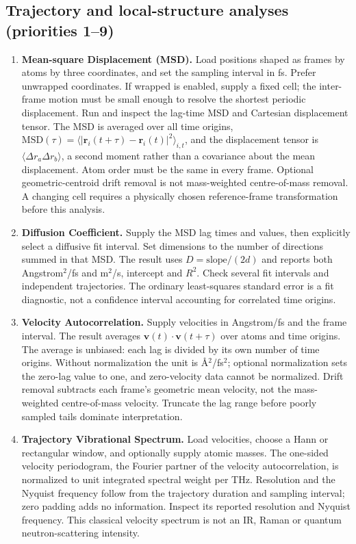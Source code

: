 \subsection{Trajectory and local-structure analyses (priorities 1--9)}
\begin{enumerate}
\item \textbf{Mean-square Displacement (MSD).} Load positions shaped as frames by atoms by three coordinates, and set the sampling interval in fs. Prefer unwrapped coordinates. If wrapped is enabled, supply a fixed cell; the inter-frame motion must be small enough to resolve the shortest periodic displacement. Run and inspect the lag-time MSD and Cartesian displacement tensor. The MSD is averaged over all time origins, $\mathrm{MSD}(\tau)=\langle|\mathbf r_i(t+\tau)-\mathbf r_i(t)|^2\rangle_{i,t}$, and the displacement tensor is $\langle\Delta r_a\Delta r_b\rangle$, a second moment rather than a covariance about the mean displacement. Atom order must be the same in every frame. Optional geometric-centroid drift removal is not mass-weighted centre-of-mass removal. A changing cell requires a physically chosen reference-frame transformation before this analysis.
\item \textbf{Diffusion Coefficient.} Supply the MSD lag times and values, then explicitly select a diffusive fit interval. Set dimensions to the number of directions summed in that MSD. The result uses $D=\mathrm{slope}/(2d)$ and reports both Angstrom$^2$/fs and m$^2$/s, intercept and $R^2$. Check several fit intervals and independent trajectories. The ordinary least-squares standard error is a fit diagnostic, not a confidence interval accounting for correlated time origins.
\item \textbf{Velocity Autocorrelation.} Supply velocities in Angstrom/fs and the frame interval. The result averages $\mathbf v(t)\cdot\mathbf v(t+\tau)$ over atoms and time origins. The average is unbiased: each lag is divided by its own number of time origins. Without normalization the unit is \AA$^2$/fs$^2$; optional normalization sets the zero-lag value to one, and zero-velocity data cannot be normalized. Drift removal subtracts each frame's geometric mean velocity, not the mass-weighted centre-of-mass velocity. Truncate the lag range before poorly sampled tails dominate interpretation.
\item \textbf{Trajectory Vibrational Spectrum.} Load velocities, choose a Hann or rectangular window, and optionally supply atomic masses. The one-sided velocity periodogram, the Fourier partner of the velocity autocorrelation, is normalized to unit integrated spectral weight per THz. Resolution and the Nyquist frequency follow from the trajectory duration and sampling interval; zero padding adds no information. Inspect its reported resolution and Nyquist frequency. This classical velocity spectrum is not an IR, Raman or quantum neutron-scattering intensity.

\end{enumerate}
